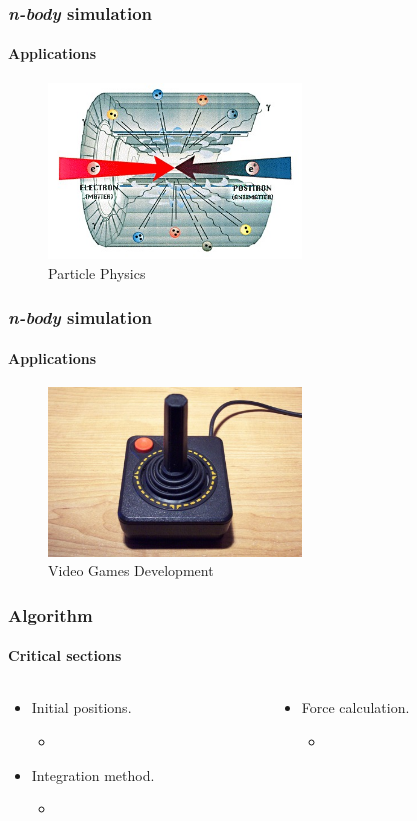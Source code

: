 \frame
{
\frametitle{\emph{n-body} simulation}
\framesubtitle{Applications}
\begin{figure}
    \centering
    \includegraphics[width=0.6\textwidth]{img/particle}
    \caption{Particle Physics}
\end{figure}
}

\frame
{
\frametitle{\emph{n-body} simulation}
\framesubtitle{Applications}
\begin{figure}
    \centering
    \includegraphics[width=0.6\textwidth]{img/atari}
    \caption{Video Games Development}
\end{figure}
}


\frame
{
\frametitle{Algorithm}
\framesubtitle{Critical sections}
\begin{columns}
    \begin{column}{0.5\textwidth}
        \begin{itemize}
            \item Initial positions.
            \begin{itemize}
                \item {}
            \end{itemize}
            \item Integration method.
            \begin{itemize}
                \item {}
            \end{itemize}
        \end{itemize}
    \end{column}
    \begin{column}{0.5\textwidth}
        \begin{itemize}
            \item Force calculation.
            \begin{itemize}
                \item {} 
            \end{itemize}
        \end{itemize}
    \end{column}
\end{columns}
}


